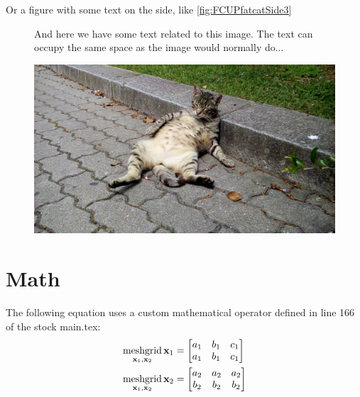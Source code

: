 Or a figure with some text on the side, like \ref{fig:FCUPfatcatSide3}
\begin{figure}
\centering
\begin{minipage}{.49\textwidth}
  And here we have some text related to this image. The text can occupy the same space as the image would normally do...
\end{minipage}%
\hfill
\begin{minipage}{.49\textwidth}
  \centering
  \includegraphics[width=.95\linewidth]{Figures/ChapterTemplate/20160517_123609.jpg}
\end{minipage}
\end{figure}



\section{Math}


The following equation uses a custom mathematical operator defined in line 166 of the stock main.tex:
\begin{equation}
\begin{aligned}
			\operatorname*{meshgrid}_{\mathbf{x}_{1},\mathbf{x}_{2}}\mathbf{x}_{1}&=\begin{bmatrix}a_{1} & b_{1} & c_{1}\\
a_{1} & b_{1} & c_{1}
\end{bmatrix}\\
			\operatorname*{meshgrid}_{\mathbf{x}_{1},\mathbf{x}_{2}}\mathbf{x}_{2}&=\begin{bmatrix}a_{2} & a_{2} & a_{2}\\
b_{2} & b_{2} & b_{2}
\end{bmatrix}
\end{aligned}
\end{equation}

